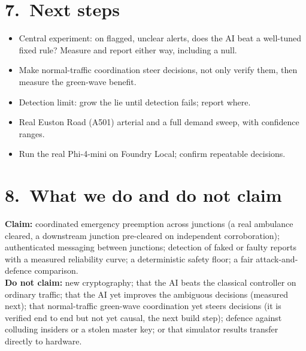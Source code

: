 \documentclass[11pt]{article}
\begin{document}
\vspace{2pt}
\begin{minipage}[t]{0.48\textwidth}
\section{7.\ Next steps}
\vspace{2pt}
\begin{itemize}
\item Central experiment: on flagged, unclear alerts, does the AI beat a well-tuned fixed rule? Measure and report either way, including a null.
\item Make normal-traffic coordination steer decisions, not only verify them, then measure the green-wave benefit.
\item Detection limit: grow the lie until detection fails; report where.
\item Real Euston Road (A501) arterial and a full demand sweep, with confidence ranges.
\item Run the real Phi-4-mini on Foundry Local; confirm repeatable decisions.
\end{itemize}
\end{minipage}\hfill
\begin{minipage}[t]{0.48\textwidth}
\section{8.\ What we do and do not claim}
\vspace{2pt}
{\footnotesize \textbf{Claim:} coordinated emergency preemption across junctions (a real ambulance cleared, a downstream junction pre-cleared on independent corroboration); authenticated messaging between junctions; detection of faked or faulty reports with a measured reliability curve; a deterministic safety floor; a fair attack-and-defence comparison.\\[3pt]
\textbf{Do not claim:} new cryptography; that the AI beats the classical controller on ordinary traffic; that the AI yet improves the ambiguous decisions (measured next); that normal-traffic green-wave coordination yet steers decisions (it is verified end to end but not yet causal, the next build step); defence against colluding insiders or a stolen master key; or that simulator results transfer directly to hardware.}
\end{minipage}
\end{document}
